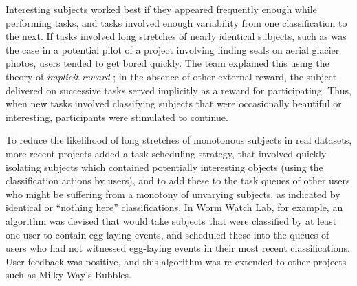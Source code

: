 \documentclass{sigchi}
\begin{document}
Interesting subjects worked best if they appeared frequently enough while performing tasks, and tasks involved enough variability from one classification to the next.  If tasks involved long stretches of nearly identical subjects, such as was the case in a potential pilot of a project involving finding seals on aerial glacier photos, users tended to get bored quickly. The team explained this using the theory of \emph{implicit reward} \cite{implicitreward}; in the absence of other external reward, the subject delivered on successive tasks served implicitly as a reward for participating. Thus, when new tasks involved classifying subjects that were occasionally beautiful or interesting, participants were stimulated to continue. %

To reduce the likelihood of long stretches of monotonous subjects in real datasets, more recent projects added a task scheduling strategy, that involved quickly isolating subjects which contained potentially interesting objects (using the classification actions by users), and to add these to the task queues of other users who might be suffering from a monotony of unvarying subjects, as indicated by identical or ``nothing here'' classifications.  In Worm Watch Lab, for example, an algorithm was devised that would take subjects that were classified by at least one user to contain egg-laying events, and scheduled these into the queues of users who had not witnessed egg-laying events in their most recent classifications.  User feedback was positive, and this algorithm was re-extended to other projects such as Milky Way's Bubbles. 


\end{document}
